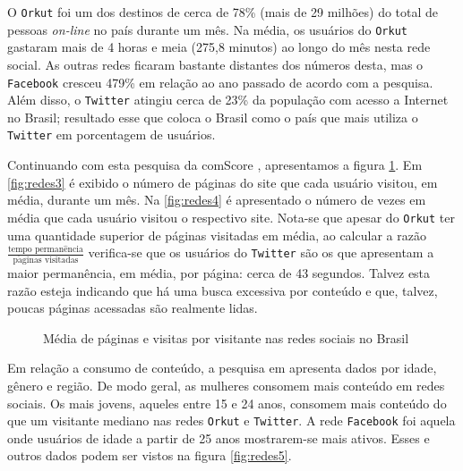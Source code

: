 \documentclass[12pt]{article}
\begin{document}
O \texttt{Orkut}
foi um dos destinos de cerca de 78\% (mais de 29 milhões) do total de
pessoas \textit{on-line} no país durante um mês. Na média, os usuários
do \texttt{Orkut} gastaram mais de 4 horas e meia (275,8 minutos) ao
longo do mês nesta rede social. As outras redes ficaram bastante
distantes dos números desta, mas o \texttt{Facebook} cresceu 479\% em
relação ao ano passado de acordo com a pesquisa. Além disso, o
\texttt{Twitter} atingiu cerca de 23\% da população com acesso a
Internet no Brasil; resultado esse que coloca o Brasil como o país que
mais utiliza o \texttt{Twitter} em porcentagem de usuários.

Continuando com esta pesquisa da comScore \cite{comscore1},
apresentamos a figura \ref{fig:dados2}. Em \ref{fig:redes3} é exibido
o número de páginas do site que cada usuário visitou, em média,
durante um mês. Na \ref{fig:redes4} é
apresentado o número de vezes em média que cada usuário visitou o
respectivo site. Nota-se que apesar do \texttt{Orkut} ter uma
quantidade superior de páginas visitadas em média, ao calcular a razão
$\frac{\mathrm{tempo\,\,perman\hat{e}ncia}}{\mathrm{p\acute{a}ginas\,\,visitadas}}$
verifica-se que os usuários do \texttt{Twitter} são os que apresentam
a maior permanência, em média, por página: cerca de 43
segundos. Talvez esta razão esteja indicando que há uma busca
excessiva por conteúdo e que, talvez, poucas páginas acessadas são
realmente lidas. %

\begin{figure}[ht]
  \centering
  \qquad
  \caption{Média de páginas e visitas por visitante nas redes sociais
    no Brasil \label{fig:dados2}}
\end{figure}

Em relação a consumo de conteúdo, a pesquisa em \cite{comscore1}
apresenta dados por idade, gênero e região. De modo geral, as mulheres
consomem mais conteúdo em redes sociais. Os mais jovens, aqueles entre
15 e 24 anos, consomem mais conteúdo do que um visitante mediano nas
redes \texttt{Orkut} e \texttt{Twitter}. A rede \texttt{Facebook} foi
aquela onde usuários de idade a partir de 25 anos mostrarem-se mais
ativos. Esses e outros dados podem ser vistos na figura
\ref{fig:redes5}. %
\end{document}
